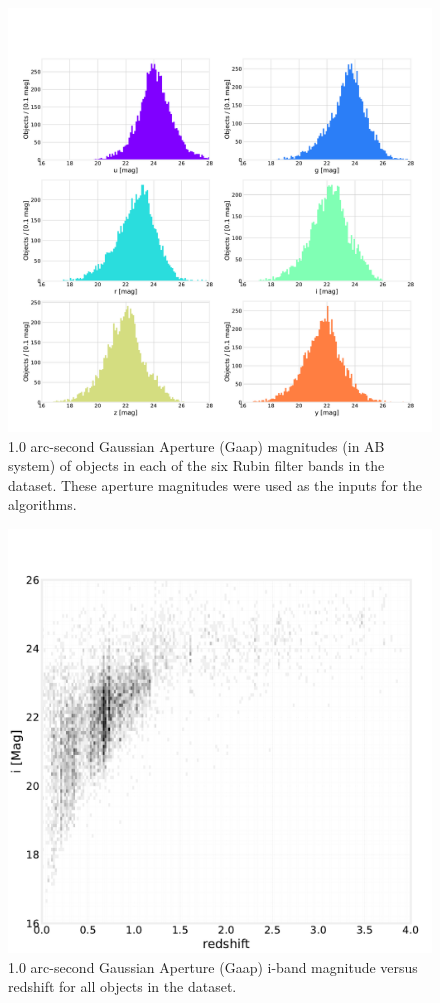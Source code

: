 \begin{figure}
    \centering
    \includegraphics[width=\linewidth]{figures/mags.pdf}
    \caption{1.0 arc-second Gaussian Aperture (Gaap) magnitudes (in AB system) of objects in each of the six Rubin filter bands in the  dataset.  These aperture magnitudes were used as the inputs for the \photoz algorithms.}
    \label{fig:dp_mags}
\end{figure}

\begin{figure}
    \centering
    \includegraphics[width=\linewidth]{figures/mag_i_v_redshift.pdf}
    \caption{1.0 arc-second Gaussian Aperture (Gaap) i-band magnitude versus redshift for all objects in the  dataset.}
    \label{fig:dp_mag_i_v_redshift}
\end{figure}

